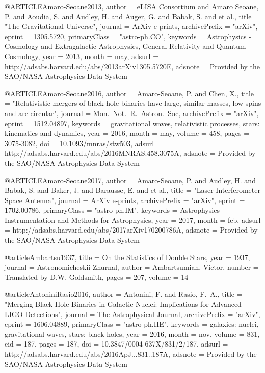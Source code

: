 \documentclass[twocolumn,tighten]{aastex63}
\begin{document}
{{{{{@ARTICLE{Amaro-Seoane2013,
   author = {{eLISA Consortium} and {Amaro Seoane}, P. and {Aoudia}, S. and 
	{Audley}, H. and {Auger}, G. and {Babak}, S. and et al.},
    title = "{The Gravitational Universe}",
  journal = {ArXiv e-prints},
archivePrefix = "arXiv",
   eprint = {1305.5720},
 primaryClass = "astro-ph.CO",
 keywords = {Astrophysics - Cosmology and Extragalactic Astrophysics, General Relativity and Quantum Cosmology},
     year = 2013,
    month = may,
   adsurl = {http://adsabs.harvard.edu/abs/2013arXiv1305.5720E},
  adsnote = {Provided by the SAO/NASA Astrophysics Data System}
}

@ARTICLE{Amaro-Seoane2016,
   author = {{Amaro-Seoane}, P. and {Chen}, X.},
    title = "{Relativistic mergers of black hole binaries have large, similar masses, low spins and are circular}",
  journal = {Mon.~Not.~R.~Astron.~Soc},
archivePrefix = "arXiv",
   eprint = {1512.04897},
 keywords = {gravitational waves, relativistic processes, stars: kinematics and dynamics},
     year = 2016,
    month = may,
   volume = 458,
    pages = {3075-3082},
      doi = {10.1093/mnras/stw503},
   adsurl = {http://adsabs.harvard.edu/abs/2016MNRAS.458.3075A},
  adsnote = {Provided by the SAO/NASA Astrophysics Data System}
}

@ARTICLE{Amaro-Seoane2017,
   author = {{Amaro-Seoane}, P. and {Audley}, H. and {Babak}, S. and {Baker}, J. and 
	{Barausse}, E. and et al.},
    title = "{Laser Interferometer Space Antenna}",
  journal = {ArXiv e-prints},
archivePrefix = "arXiv",
   eprint = {1702.00786},
 primaryClass = "astro-ph.IM",
 keywords = {Astrophysics - Instrumentation and Methods for Astrophysics},
     year = 2017,
    month = feb,
   adsurl = {http://adsabs.harvard.edu/abs/2017arXiv170200786A},
  adsnote = {Provided by the SAO/NASA Astrophysics Data System}
}

@article{Ambartsu1937,
    title = {{On the Statistics of Double Stars}},
    year = {1937},
    journal = {Astronomicheskii Zhurnal},
    author = {Ambartsumian, Victor},
    number = {Translated by D.W. Goldsmith},
    pages = {207},
    volume = {14}
}

@article{AntoniniRasio2016,
   author = {{Antonini}, F. and {Rasio}, F.~A.},
    title = "{Merging Black Hole Binaries in Galactic Nuclei: Implications for Advanced-LIGO Detections}",
  journal = {The Astrophysical Journal},
archivePrefix = "arXiv",
   eprint = {1606.04889},
 primaryClass = "astro-ph.HE",
 keywords = {galaxies: nuclei, gravitational waves, stars: black holes},
     year = 2016,
    month = nov,
   volume = 831,
      eid = {187},
    pages = {187},
      doi = {10.3847/0004-637X/831/2/187},
   adsurl = {http://adsabs.harvard.edu/abs/2016ApJ...831..187A},
  adsnote = {Provided by the SAO/NASA Astrophysics Data System}}

}}}}}
\end{document}
